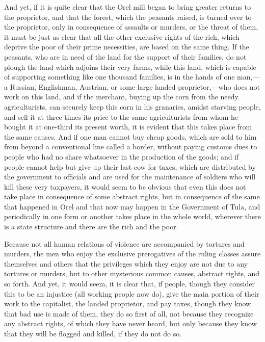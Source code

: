 \documentclass{book}
\begin{document}
And yet, if it is quite clear that the Orel mill began to bring greater returns to the proprietor, and that the forest, which the peasants raised, is turned over to the proprietor, only in consequence of assaults or murders, or the threat of them, it must be just as clear that all the other exclusive rights of the rich, which deprive the poor of their prime necessities, are based on the same thing. If the peasants, who are in need of the land for the support of their families, do not plough the land which adjoins their very farms, while this land, which is capable of supporting something like one thousand families, is in the hands of one man,—a Russian, Englishman, Austrian, or some large landed proprietor,—who does not work on this land, and if the merchant, buying up the corn from the needy agriculturists, can securely keep this corn in his granaries, amidst starving people, and sell it at three times its price to the same agriculturists from whom he bought it at one-third its present worth, it is evident that this takes place from the same causes. And if one man cannot buy cheap goods, which are sold to him from beyond a conventional line called a border, without paying customs dues to people who had no share whatsoever in the production of the goods; and if people cannot help but give up their last cow for taxes, which are distributed by the government to officials and are used for the maintenance of soldiers who will kill these very taxpayers, it would seem to be obvious that even this does not take place in consequence of some abstract rights, but in consequence of the same that happened in Orel and that now may happen in the Government of Tula, and periodically in one form or another takes place in the whole world, wherever there is a state structure and there are the rich and the poor.

Because not all human relations of violence are accompanied by tortures and murders, the men who enjoy the exclusive prerogatives of the ruling classes assure themselves and others that the privileges which they enjoy are not due to any tortures or murders, but to other mysterious common causes, abstract rights, and so forth. And yet, it would seem, it is clear that, if people, though they consider this to be an injustice (all working people now do), give the main portion of their work to the capitalist, the landed proprietor, and pay taxes, though they know that bad use is made of them, they do so first of all, not because they recognize any abstract rights, of which they have never heard, but only because they know that they will be flogged and killed, if they do not do so.
\end{document}
